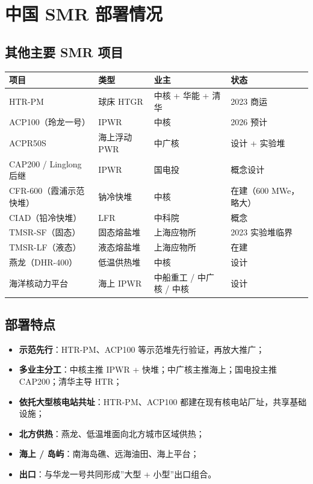 \documentclass[
  UTF8,
  scheme=plain,
  fontsize=10pt,
  openany
]{ctexbook}
\begin{document}
\section{中国 SMR
部署情况}\label{ux4e2dux56fd-smr-ux90e8ux7f72ux60c5ux51b5}

\subsection{其他主要 SMR
项目}\label{ux5176ux4ed6ux4e3bux8981-smr-ux9879ux76ee}

{\def\LTcaptype{none} %
\begin{longtable}[]{@{}llll@{}}
\toprule\noalign{}
项目 & 类型 & 业主 & 状态 \\
\midrule\noalign{}
\endhead
\bottomrule\noalign{}
\endlastfoot
HTR-PM & 球床 HTGR & 中核 + 华能 + 清华 & 2023 商运 \\
ACP100（玲龙一号） & IPWR & 中核 & 2026 预计 \\
ACPR50S & 海上浮动 PWR & 中广核 & 设计 + 实验堆 \\
CAP200 / Linglong 后继 & IPWR & 国电投 & 概念设计 \\
CFR-600（霞浦示范快堆） & 钠冷快堆 & 中核 & 在建（600 MWe，略大） \\
CIAD（铅冷快堆） & LFR & 中科院 & 概念 \\
TMSR-SF（固态） & 固态熔盐堆 & 上海应物所 & 2023 实验堆临界 \\
TMSR-LF（液态） & 液态熔盐堆 & 上海应物所 & 在建 \\
燕龙（DHR-400） & 低温供热堆 & 中核 & 设计 \\
海洋核动力平台 & 海上 IPWR & 中船重工 / 中广核 / 中核 & 设计 \\
\end{longtable}
}

\subsection{部署特点}\label{ux90e8ux7f72ux7279ux70b9}

\begin{itemize}
\tightlist
\item
  \textbf{示范先行}：HTR-PM、ACP100 等示范堆先行验证，再放大推广；
\item
  \textbf{多业主分工}：中核主推 IPWR + 快堆；中广核主推海上；国电投主推
  CAP200；清华主导 HTR；
\item
  \textbf{依托大型核电站共址}：HTR-PM、ACP100
  都建在现有核电站厂址，共享基础设施；
\item
  \textbf{北方供热}：燕龙、低温堆面向北方城市区域供热；
\item
  \textbf{海上 / 岛屿}：南海岛礁、远海油田、海上平台；
\item
  \textbf{出口}：与华龙一号共同形成''大型 + 小型''出口组合。
\end{itemize}
\end{document}
